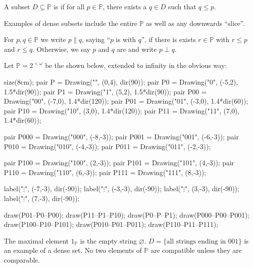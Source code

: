\documentclass[11pt]{scrreprt}
\newcommand{\Po}{\mathbb P}
\begin{document}
\begin{definition}
	A subset $D \subseteq \Po$ is  if for all $p \in \Po$,
	there exists a $q  \in D$ such that $q \le p$.
\end{definition}
Examples of dense subsets include the entire $\Po$ as well
as any downwards ``slice''.

\begin{definition}
	For $p,q \in \Po$ we write $p \parallel q$,
	saying ``$p$ is  with $q$'',
	if there is exists $r \in \Po$ with $r \le p$ and $r \le q$.
	Otherwise, we say $p$ and $q$ are 
	and write $p \perp q$.
\end{definition}
\begin{example}
	Let $\Po = 2^{<\omega}$ be the  shown below,
	extended to infinity in the obvious way:
	\begin{center}
		\begin{asy}
			size(8cm);
			pair P = Drawing("\varnothing", (0,4), dir(90));
			pair P0 = Drawing("0", (-5,2), 1.5*dir(90));
			pair P1 = Drawing("1", (5,2),  1.5*dir(90));
			pair P00 = Drawing("00", (-7,0), 1.4*dir(120));
			pair P01 = Drawing("01", (-3,0), 1.4*dir(60));
			pair P10 = Drawing("10", (3,0),  1.4*dir(120));
			pair P11 = Drawing("11", (7,0),  1.4*dir(60));

			pair P000 = Drawing("000", (-8,-3));
			pair P001 = Drawing("001", (-6,-3));
			pair P010 = Drawing("010", (-4,-3));
			pair P011 = Drawing("011", (-2,-3));

			pair P100 = Drawing("100", (2,-3));
			pair P101 = Drawing("101", (4,-3));
			pair P110 = Drawing("110", (6,-3));
			pair P111 = Drawing("111", (8,-3));

			label("$\vdots$", (-7,-3), dir(-90));
			label("$\vdots$", (-3,-3), dir(-90));
			label("$\vdots$", (3,-3), dir(-90));
			label("$\vdots$", (7,-3), dir(-90));

			draw(P01--P0--P00);
			draw(P11--P1--P10);
			draw(P0--P--P1);
			draw(P000--P00--P001);
			draw(P100--P10--P101);
			draw(P010--P01--P011);
			draw(P110--P11--P111);
		\end{asy}
	\end{center}

	\begin{enumerate}[(a)]
		\ii The maximal element $1_\Po$ is the empty string $\varnothing$.
		\ii $D = \{\text{all strings ending in $001$}\}$ is an example of a dense set.
		\ii No two elements of $\Po$ are compatible unless they are comparable.
	\end{enumerate}
\end{example}
\end{document}
